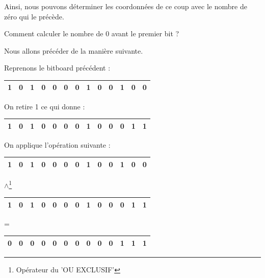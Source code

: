 \documentclass{report}
\begin{document}
Ainsi, nous pouvons déterminer les coordonnées de ce coup avec le nombre de zéro qui le précède.\newline

Comment calculer le nombre de 0 avant le premier bit ?\newline

Nous allons précéder de la manière suivante.

Reprenons le bitboard précédent :
\begin{center}
\renewcommand{\arraystretch} {1.5}
    \begin{tabular}{|p{0.2cm}|c|c|c|c|c|c|c|c|c|c|c|c|}
        \hline
        1 & 0 & 1 & 0 & 0 & 0 & 0 & 1 & 0 & 0 & 1 & 0 & 0\\
        \hline
    \end{tabular}
\end{center}

On retire 1 ce qui donne :
\begin{center}
\renewcommand{\arraystretch} {1.5}
    \begin{tabular}{|p{0.2cm}|c|c|c|c|c|c|c|c|c|c|c|c|}
        \hline
        1 & 0 & 1 & 0 & 0 & 0 & 0 & 1 & 0 & 0 & 0 & 1 & 1\\
        \hline
    \end{tabular}
\end{center}

On applique l'opération suivante :

\begin{center}
\renewcommand{\arraystretch} {1.5}
    \begin{tabular}{|p{0.2cm}|c|c|c|c|c|c|c|c|c|c|c|c|}
        \hline
        1 & 0 & 1 & 0 & 0 & 0 & 0 & 1 & 0 & 0 & 1 & 0 & 0\\
        \hline
    \end{tabular}
\end{center}
\begin{center}
    $\wedge$\footnote{Opérateur du 'OU EXCLUSIF'}
\end{center}
\begin{center}
\renewcommand{\arraystretch} {1.5}
    \begin{tabular}{|p{0.2cm}|c|c|c|c|c|c|c|c|c|c|c|c|}
        \hline
        1 & 0 & 1 & 0 & 0 & 0 & 0 & 1 & 0 & 0 & 0 & 1 & 1\\
        \hline
    \end{tabular}
\end{center}
\begin{center}
    =
\end{center}
\begin{center}
\renewcommand{\arraystretch} {1.5}
    \begin{tabular}{|p{0.2cm}|c|c|c|c|c|c|c|c|c|c|c|c|}
        \hline
        0 & 0 & 0 & 0 & 0 & 0 & 0 & 0 & 0 & 0 & 1 & 1 & 1\\
        \hline
    \end{tabular}
\end{center}
\end{document}
